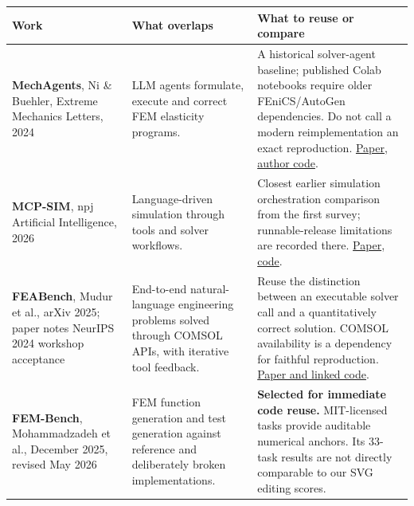 \documentclass[
  11pt,
  a4paper,
]{article}
\newcounter{none} %
\begin{document}
{\def\LTcaptype{none} %
\begin{longtable}[]{@{}
  >{\raggedright\arraybackslash}p{}
  >{\raggedright\arraybackslash}p{}
  >{\raggedright\arraybackslash}p{}@{}}
\toprule\noalign{}
\begin{minipage}[b]{\linewidth}\raggedright
Work
\end{minipage} & \begin{minipage}[b]{\linewidth}\raggedright
What overlaps
\end{minipage} & \begin{minipage}[b]{\linewidth}\raggedright
What to reuse or compare
\end{minipage} \\
\midrule\noalign{}
\endhead
\bottomrule\noalign{}
\endlastfoot
\textbf{MechAgents}, Ni \& Buehler, Extreme Mechanics Letters, 2024 &
LLM agents formulate, execute and correct FEM elasticity programs. & A
historical solver-agent baseline; published Colab notebooks require
older FEniCS/AutoGen dependencies. Do not call a modern reimplementation
an exact reproduction. \href{https://arxiv.org/abs/2311.08166}{Paper},
\href{https://github.com/lamm-mit/MechAgents}{author code}. \\
\textbf{MCP-SIM}, npj Artificial Intelligence, 2026 & Language-driven
simulation through tools and solver workflows. & Closest earlier
simulation orchestration comparison from the first survey;
runnable-release limitations are recorded there.
\href{https://www.nature.com/articles/s44387-025-00057-z}{Paper},
\href{https://github.com/KAIST-M4/MCP-SIM}{code}. \\
\textbf{FEABench}, Mudur et al., arXiv 2025; paper notes NeurIPS 2024
workshop acceptance & End-to-end natural-language engineering problems
solved through COMSOL APIs, with iterative tool feedback. & Reuse the
distinction between an executable solver call and a quantitatively
correct solution. COMSOL availability is a dependency for faithful
reproduction. \href{https://arxiv.org/abs/2504.06260}{Paper and linked
code}. \\
\textbf{FEM-Bench}, Mohammadzadeh et al., December 2025, revised May
2026 & FEM function generation and test generation against reference and
deliberately broken implementations. & \textbf{Selected for immediate
code reuse.} MIT-licensed tasks provide auditable numerical anchors. Its
33-task results are not directly comparable to our SVG editing scores.

\end{longtable}}
\end{document}
